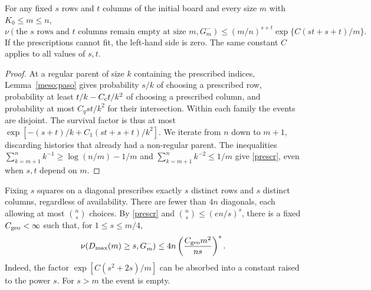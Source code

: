 \begin{lema}\label{meso:prescripciones}
For any fixed $s$ rows and $t$ columns of the initial board and every size $m$ with
$K_0\le m\le n$,
\begin{equation}\label{prescr}
 \nu(\text{the $s$ rows and $t$ columns remain empty at size $m$},G_m^-)
 \le (m/n)^{s+t}\exp\{C(st+s+t)/m\}.
\end{equation}
If the prescriptions cannot fit, the left-hand side is zero. The same constant $C$ applies to all values of
$s,t$.
\end{lema}
\begin{proof}
At a regular parent of size $k$ containing the prescribed indices, Lemma~\ref{meso:paso} gives probability
$s/k$ of choosing a prescribed row, probability at least $t/k-C_{\rm c}t/k^2$ of choosing a prescribed
column, and probability at most $C_qst/k^2$ for their intersection. Within each family the events are
disjoint. The survival factor is thus at most $\exp[-(s+t)/k+C_1(st+s+t)/k^2]$. We iterate from $n$ down to
$m+1$, discarding histories that already had a non-regular parent. The inequalities $\sum_{k=m+1}^n
k^{-1}\ge\log(n/m)-1/m$ and $\sum_{k=m+1}^n k^{-2}\le1/m$ give \eqref{prescr}, even when $s,t$ depend on
$m$.
\end{proof}

Fixing $s$ squares on a diagonal prescribes exactly $s$ distinct rows and $s$ distinct columns, regardless
of availability. There are fewer than $4n$ diagonals, each allowing at most $\binom ns$ choices. By
\eqref{prescr} and $\binom ns\le(en/s)^s$, there is a fixed $C_{\rm geo}<\infty$ such that, for $1\le s\le
m/4$,
\begin{equation}\label{geompres}
 \nu(D_{\max}(m)\ge s,G_m^-)\le 4n\left(\frac{C_{\rm geo}m^2}{ns}\right)^s .
\end{equation}
Indeed, the factor $\exp[C(s^2+2s)/m]$ can be absorbed into a constant raised to the power $s$. For $s>m$
the event is empty.
